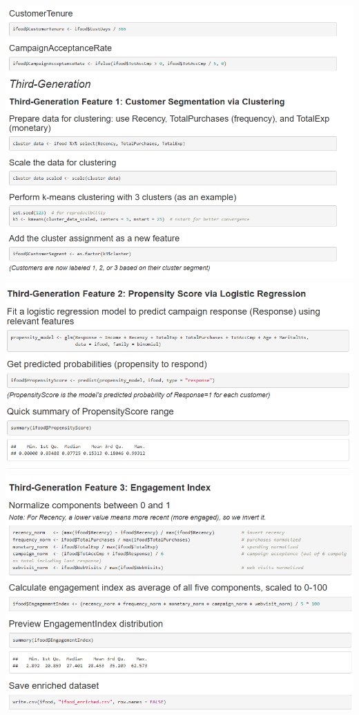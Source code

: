 \includegraphics[width=\textwidth]{Imatges/pre5.png}
\centering
\includegraphics[width=\textwidth]{Imatges/pre6.png}
\centering
\includegraphics[width=\textwidth]{Imatges/pre7.png}
